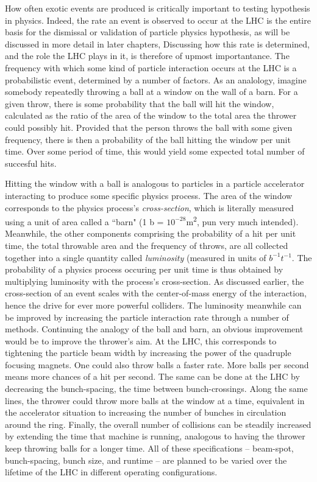     How often exotic events are produced is critically important to testing hypothesis in physics.
    Indeed, the rate an event is observed to occur at the LHC is the entire basis for the dismissal or validation of particle physics hypothesis, as will be discussed in more detail in later chapters,
    Discussing how this rate is determined, and the role the LHC plays in it, is therefore of upmost importantance.
    The frequency with which some kind of particle interaction occurs at the LHC is a probabilistic event, determined by a number of factors.
    As an analology, imagine somebody repeatedly throwing a ball at a window on the wall of a barn.
    For a given throw, there is some probability that the ball will hit the window, calculated as the ratio of the area of the window to the total area the thrower could possibly hit.
    Provided that the person throws the ball with some given frequency, there is then a probability of the ball hitting the window per unit time.
    Over some period of time, this would yield some expected total number of succesful hits.

    Hitting the window with a ball is analogous to particles in a particle accelerator interacting to produce some specific physics process.
    The area of the window corresponds to the physics process's \textit{cross-section}, which is literally measured using a unit of area called a ``barn" (1 b = $10^{-28}$m\textsuperscript{2}, pun very much intended).
    Meanwhile, the other components comprising the probability of a hit per unit time, the total throwable area and the frequency of throws, are all collected together into a single quantity called \textit{luminosity} (measured in units of $b^{-1}t^{-1}$. 
    The probability of a physics process occuring per unit time is thus obtained by multiplying luminosity with the process's cross-section.
    As discussed earlier, the cross-section of an event scales with the center-of-mass energy of the interaction, hence the drive for ever more powerful colliders.
    The luminosity meanwhile can be improved by increasing the particle interaction rate through a number of methods.
    Continuing the analogy of the ball and barn, an obvious improvement would be to improve the thrower's aim.
    At the LHC, this corresponds to tightening the particle beam width by increasing the power of the quadruple focusing magnets.
    One could also throw balls a faster rate.
    More balls per second means more chances of a hit per second.
    The same can be done at the LHC by decreasing the bunch-spacing, the time between bunch-crossings.
    Along the same lines, the thrower could throw more balls at the window at a time, equivalent in the accelerator situation to increasing the number of bunches in circulation around the ring.
    Finally, the overall number of collisions can be steadily increased by extending the time that machine is running, analogous to having the thrower keep throwing balls for a longer time.
    All of these specifications -- beam-spot, bunch-spacing, bunch size, and runtime -- are planned to be varied over the lifetime of the LHC in different operating configurations.

